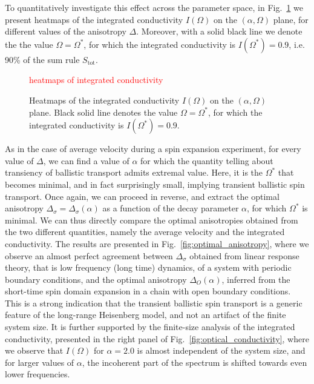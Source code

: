 To quantitatively investigate this effect across the parameter space, in Fig.~\ref{fig:I_cond_heatmap}
we present heatmaps of the integrated conductivity \(I(\varOmega)\) on the \((\alpha ,\varOmega)\) plane, 
for different values of the anisotropy \(\Delta\). Moreover, with a solid black line we denote the
the value \(\varOmega = \varOmega^{\ast}\), for which the integrated conductivity is \(I(\varOmega^{\ast}) = 0.9\),
i.e. 90\% of the sum rule \(S_{\mathrm{tot}}\).

\begin{figure}[htbp]
  \centering
  \textcolor{red}{heatmaps of integrated conductivity}
  \caption{Heatmaps of the integrated conductivity \(I(\varOmega)\) on the \((\alpha ,\varOmega)\) plane.
  Black solid line denotes the value \(\varOmega = \varOmega^{\ast}\), 
  for which the integrated conductivity is \(I(\varOmega^{\ast}) = 0.9\).}
  \label{fig:I_cond_heatmap}
\end{figure}

As in the case of average velocity during a spin expansion experiment, 
for every value of \(\Delta\), we can find a value of \(\alpha\) for which the quantity telling about transiency
of ballistic transport admits extremal value. Here, it is the \(\varOmega^{\ast}\) that becomes minimal,
and in fact surprisingly small, implying transient ballistic spin transport. Once again, we can proceed 
in reverse, and extract the optimal anisotropy \(\Delta_{\sigma} = \Delta_{\sigma}(\alpha)\) as a function
of the decay parameter \(\alpha\), for which \(\varOmega^{\ast}\) is minimal. We can thus directly compare
the optimal anisotropies obtained from the two different quantities, namely the average velocity and the integrated conductivity.
The results are presented in Fig.~\ref{fig:optimal_anisotropy}, where we observe an almost perfect
agreement between \(\Delta_{\sigma}\) obtained from linear response theory, that is low frequency (long time) dynamics,
of a system with periodic boundary conditions,
and the optimal anisotropy \(\Delta_{O}(\alpha)\), inferred from the short-time spin domain expansion in a chain
with open boundary conditions. This is a strong indication that the transient ballistic spin transport
is a generic feature of the long-range Heisenberg model, and not an artifact of the finite system size.
It is further supported by the finite-size analysis of the integrated conductivity, presented in the right panel
of Fig.~\ref{fig:optical_conductivity}, where we observe that \(I(\varOmega)\) for \(\alpha = 2.0\)
is almost independent of the system size, and for larger values of \(\alpha\), the incoherent part of the spectrum
is shifted towards even lower frequencies.

